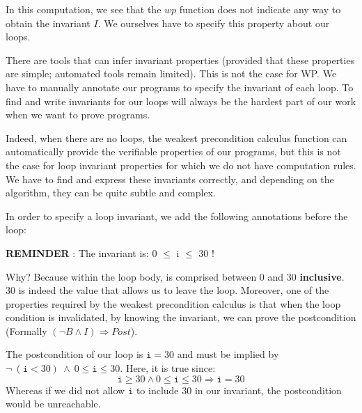 In this computation, we see that the $wp$ function does not
indicate any way to obtain the invariant $I$. We ourselves have to specify
this property about our loops.





There are tools that can infer invariant properties (provided that
these properties are simple; automated tools remain limited). This is not
the case for WP. We have to manually annotate our programs to
specify the invariant of each loop. To find and write invariants for our
loops will always be the hardest part of our work when we want to prove
programs.



Indeed, when there are no loops, the weakest precondition calculus
function can automatically provide the verifiable properties of our
programs, but this is not the case for loop invariant properties for which we
do not have computation rules. We have to find and express these invariants
correctly, and depending on the algorithm, they can be quite subtle and
complex.



In order to specify a loop invariant, we add the following annotations
before the loop:






\begin{Warning}
  \textbf{REMINDER} : The invariant is: 0 $\leq$ i \textbf{$\leq$} 30 !
\end{Warning}


Why? Because within the loop body,  is comprised between 0 and
30 \textbf{inclusive}. 30 is indeed the value that allows us to leave the
loop. Moreover, one of the properties required by the weakest
precondition calculus is that when the loop condition is invalidated, by
knowing the invariant, we can prove the postcondition (Formally
$(\neg B \wedge I) \Rightarrow Post$).

The postcondition of our loop is $\texttt{i} = 30$ and must be implied
by $\neg\ (\texttt{i} < 30)\ \wedge\ 0 \leq \texttt{i} \leq 30$. Here, it is
true since:
$$\texttt{i} \geq 30 \wedge 0 \leq \texttt{i} \leq 30 \Rightarrow \texttt{i} = 30$$
Whereas if we did not allow $\texttt{i}$ to include 30 in our invariant, the postcondition
would be unreachable.



